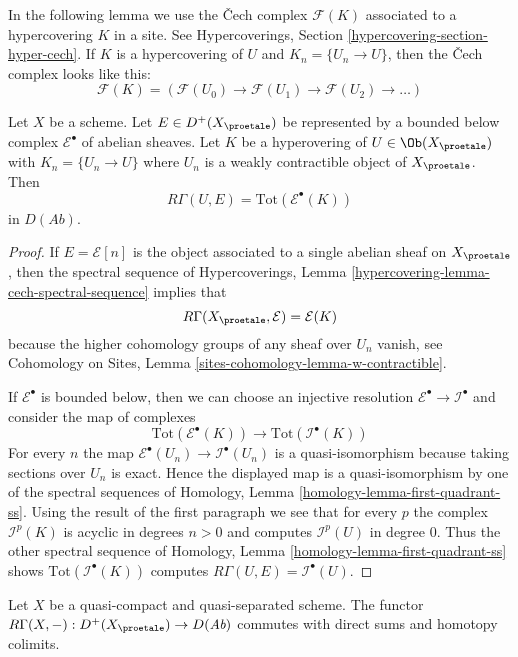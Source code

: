 \noindent
In the following lemma we use the {\v C}ech complex $\mathcal{F}(K)$
associated to a hypercovering $K$ in a site. See
Hypercoverings, Section \ref{hypercovering-section-hyper-cech}.
If $K$ is a hypercovering of $U$ and $K_n = \{U_n \to U\}$, then
the {\v C}ech complex looks like this:
$$
\mathcal{F}(K) = (\mathcal{F}(U_0) \to \mathcal{F}(U_1) \to
\mathcal{F}(U_2) \to\ldots )
$$

\begin{lemma}
\label{lemma-compute-cohomology}
Let $X$ be a scheme. Let $E \in D^+(X_\proetale)$ be represented by
a bounded below complex $\mathcal{E}^\bullet$ of abelian sheaves.
Let $K$ be a hyperovering of $U \in \Ob(X_\proetale)$ with
$K_n = \{U_n \to U\}$ where $U_n$ is a weakly contractible object of
$X_\proetale$. Then
$$
R\Gamma(U, E) = \text{Tot}(\mathcal{E}^\bullet(K))
$$
in $D(\textit{Ab})$.
\end{lemma}

\begin{proof}
If $E = \mathcal{E}[n]$ is the object associated to a single abelian
sheaf on $X_\proetale$, then the spectral sequence of
Hypercoverings, Lemma \ref{hypercovering-lemma-cech-spectral-sequence}
implies that
$$
R\Gamma(X_\proetale, \mathcal{E}) = \mathcal{E}(K)
$$
because the higher cohomology groups of any sheaf over $U_n$ vanish, see
Cohomology on Sites, Lemma \ref{sites-cohomology-lemma-w-contractible}.

\medskip\noindent
If $\mathcal{E}^\bullet$ is bounded below, then we can choose an injective
resolution $\mathcal{E}^\bullet \to \mathcal{I}^\bullet$ and consider
the map of complexes
$$
\text{Tot}(\mathcal{E}^\bullet(K)) \longrightarrow
\text{Tot}(\mathcal{I}^\bullet(K))
$$
For every $n$ the map $\mathcal{E}^\bullet(U_n) \to \mathcal{I}^\bullet(U_n)$
is a quasi-isomorphism because taking sections over $U_n$ is exact.
Hence the displayed map is a quasi-isomorphism by one of the spectral
sequences of
Homology, Lemma \ref{homology-lemma-first-quadrant-ss}.
Using the result of the first paragraph we see that for every $p$
the complex $\mathcal{I}^p(K)$ is acyclic in degrees $n > 0$ and
computes $\mathcal{I}^p(U)$ in degree $0$. Thus the other spectral
sequence of
Homology, Lemma \ref{homology-lemma-first-quadrant-ss}
shows $\text{Tot}(\mathcal{I}^\bullet(K))$ computes
$R\Gamma(U, E) = \mathcal{I}^\bullet(U)$.
\end{proof}

\begin{lemma}
\label{lemma-quasi-compact-quasi-separated-commutes-direct-sums}
Let $X$ be a quasi-compact and quasi-separated scheme.
The functor $R\Gamma(X, -) : D^+(X_\proetale) \to D(\textit{Ab})$
commutes with direct sums and homotopy colimits.
\end{lemma}

